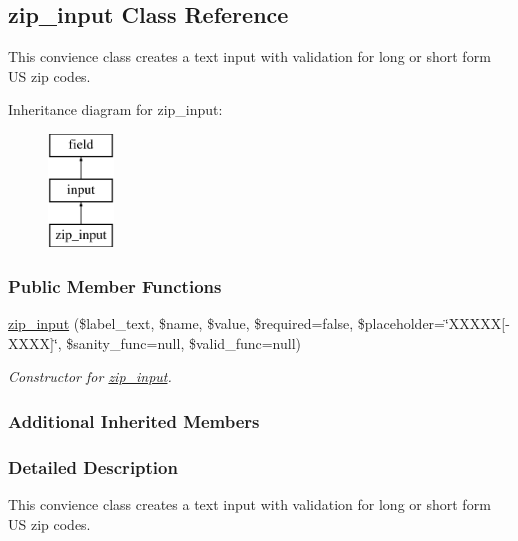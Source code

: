 \hypertarget{classzip__input}{\subsection{zip\-\_\-input Class Reference}
\label{classzip__input}
}


This convience class creates a text input with validation for long or short form U\-S zip codes.  


Inheritance diagram for zip\-\_\-input\-:\begin{figure}[H]
\begin{center}
\leavevmode
\includegraphics[height=3.000000cm]{classzip__input}
\end{center}
\end{figure}
\subsubsection*{Public Member Functions}
\begin{DoxyCompactItemize}
\item 
\hyperlink{classzip__input_ab83f0958692bf5ff823d4889a5a4375a}{zip\-\_\-input} (\$label\-\_\-text, \$name, \$value, \$required=false, \$placeholder=\char`\"{}X\-X\-X\-X\-X\mbox{[}-\/X\-X\-X\-X\mbox{]}\char`\"{}, \$sanity\-\_\-func=null, \$valid\-\_\-func=null)
\begin{DoxyCompactList}\small\item\em Constructor for \hyperlink{classzip__input}{zip\-\_\-input}. \end{DoxyCompactList}\end{DoxyCompactItemize}
\subsubsection*{Additional Inherited Members}


\subsubsection{Detailed Description}
This convience class creates a text input with validation for long or short form U\-S zip codes. 

